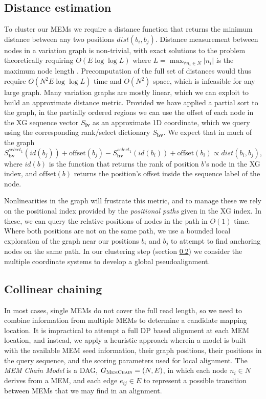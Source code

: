 \subsection{Distance estimation}
\label{sec:distance_estimation}
To cluster our MEMs we require a distance function that returns the minimum distance between any two positions $dist(b_i, b_j)$. %
Distance measurement between nodes in a variation graph is non-trivial, with exact solutions to the problem theoretically requiring $O(E \log \log L)$ where $L = \max_{\forall n_i \in N} |n_i|$ is the maximum node length \cite{karlsson1983mlog}.
Precomputation of the full set of distances would thus require $O(N^2 E \log \log L)$ time and $O(N^2)$ space, which is infeasible for any large graph.
Many variation graphs are mostly linear, which we can exploit to build an approximate distance metric.
Provided we have applied a partial sort to the graph, in the partially ordered regions we can use the offset of each node in the XG sequence vector $S_\textbf{iv}$ as an approximate 1D coordinate, which we query using the corresponding rank/select dictionary $S_\textbf{bv}$.
We expect that in much of the graph $S_\textbf{bv}^{select_1}(id(b_j))+\mbox{offset}(b_j) - S_\textbf{bv}^{select_1}(id(b_i))+\mbox{offset}(b_i) \propto dist(b_i, b_j)$, where $id(b)$ is the function that returns the rank of position $b$'s node in the XG index, and $\mbox{offset}(b)$ returns the position's offset inside the sequence label of the node.

Nonlinearities in the graph will frustrate this metric, and to manage these we rely on the positional index provided by the \emph{positional paths} given in the XG index.
In these, we can query the relative positions of nodes in the path in $O(1)$ time.
Where both positions are not on the same path, we use a bounded local exploration of the graph near our positions $b_i$ and $b_j$ to attempt to find anchoring nodes on the same path.
In our clustering step (section \ref{sec:collinear_chaining}) we consider the multiple coordinate systems to develop a global pseudoalignment.

\subsection{Collinear chaining}
\label{sec:collinear_chaining}

In most cases, single MEMs do not cover the full read length, so we need to combine information from multiple MEMs to determine a candidate mapping location.
It is impractical to attempt a full DP based alignment at each MEM location, and instead, we apply a heuristic approach wherein a model is built with the available MEM seed information, their graph positions, their positions in the query sequence, and the scoring parameters used for local alignment.
The \emph{MEM Chain Model} is a DAG, $G_\textsc{MemChain} = (N, E)$, in which each node $n_i \in N$ derives from a MEM, and each edge $e_{ij} \in E$ to represent a possible transition between MEMs that we may find in an alignment.

